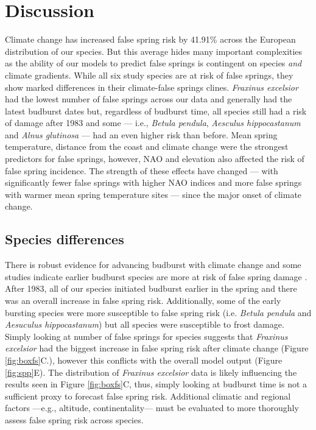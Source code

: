 \documentclass{article}\usepackage[]{graphicx}\usepackage[]{color}
\begin{document}
\section*{Discussion}
Climate change has increased false spring risk by 41.91\% across the European distribution of our species. But this average hides many important complexities as the ability of our models to predict false springs is contingent on species \textit{and} climate gradients. While all six study species are at risk of false springs, they show marked differences in their climate-false springs clines. \textit{Fraxinus excelsior} had the lowest number of false springs across our data and generally had the latest budburst dates but, regardless of budburst time, all species still had a risk of damage after 1983 and some  --- i.e., \textit{Betula pendula}, \textit{Aesculus hippocastanum} and \textit{Alnus glutinosa} --- had an even higher risk than before. Mean spring temperature, distance from the coast and climate change were the strongest predictors for false springs, however, NAO and elevation also affected the risk of false spring incidence. The strength of these effects have changed --- with significantly fewer false springs with higher NAO indices and more false springs with warmer mean spring temperature sites --- since the major onset of climate change. 

\subsection*{Species differences}
There is robust evidence for advancing budburst with climate change \citep{Cleland2007, IPCC2014, Wolkovich2012} and some studies indicate earlier budburst species are more at risk of false spring damage \citep{Ma2018}. After 1983, all of our species initiated budburst earlier in the spring and there was an overall increase in false spring risk. Additionally, some of the early bursting species were more susceptible to false spring risk (i.e. \textit{Betula pendula} and \textit{Aesuculus hippocastanum}) but all species were susceptible to frost damage. Simply looking at number of false springs for species suggests that \textit{Fraxinus excelsior} had the biggest increase in false spring risk after climate change (Figure \ref{fig:boxfs}C.), however this conflicts with the overall model output (Figure \ref{fig:spp}E). The distribution of \textit{Fraxinus excelsior} data is likely influencing the results seen in Figure \ref{fig:boxfs}C, thus, simply looking at budburst time is not a sufficient proxy to forecast false spring risk. Additional climatic and regional factors ---e.g., altitude, continentality--- must be evaluated to more thoroughly assess false spring risk across species.
  
\end{document}
